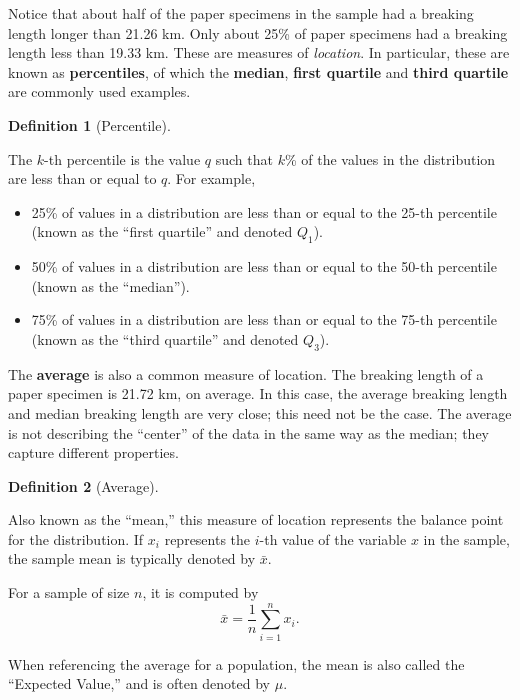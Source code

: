 \documentclass[
  letterpaper,
  DIV=11,
  numbers=noendperiod]{scrreprt}
\providecommand{\tightlist}{%
  \setlength{\itemsep}{0pt}\setlength{\parskip}{0pt}}\usepackage{longtable,booktabs,array}
\theoremstyle{definition}
\newtheorem{definition}{Definition}[chapter]
\theoremstyle{definition}
\theoremstyle{plain}
\theoremstyle{remark}
\begin{document}
Notice that about half of the paper specimens in the sample had a
breaking length longer than 21.26 km. Only about 25\% of paper specimens
had a breaking length less than 19.33 km. These are measures of
\emph{location}. In particular, these are known as \textbf{percentiles},
of which the \textbf{median}, \textbf{first quartile} and \textbf{third
quartile} are commonly used examples.

\begin{definition}[Percentile]\protect\hypertarget{def-percentile}{}\label{def-percentile}

The \(k\)-th percentile is the value \(q\) such that \(k\)\% of the
values in the distribution are less than or equal to \(q\). For example,

\begin{itemize}
\tightlist
\item
  25\% of values in a distribution are less than or equal to the 25-th
  percentile (known as the ``first quartile'' and denoted \(Q_1\)).
\item
  50\% of values in a distribution are less than or equal to the 50-th
  percentile (known as the ``median'').
\item
  75\% of values in a distribution are less than or equal to the 75-th
  percentile (known as the ``third quartile'' and denoted \(Q_3\)).
\end{itemize}

\end{definition}

The \textbf{average} is also a common measure of location. The breaking
length of a paper specimen is 21.72 km, on average. In this case, the
average breaking length and median breaking length are very close; this
need not be the case. The average is not describing the ``center'' of
the data in the same way as the median; they capture different
properties.

\begin{definition}[Average]\protect\hypertarget{def-average}{}\label{def-average}

Also known as the ``mean,'' this measure of location represents the
balance point for the distribution. If \(x_i\) represents the \(i\)-th
value of the variable \(x\) in the sample, the sample mean is typically
denoted by \(\bar{x}\).

For a sample of size \(n\), it is computed by
\[\bar{x} = \frac{1}{n}\sum_{i=1}^{n} x_i.\]

When referencing the average for a population, the mean is also called
the ``Expected Value,'' and is often denoted by \(\mu\).

\end{definition}
\end{document}

